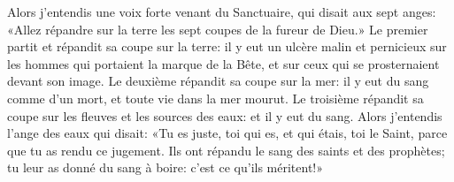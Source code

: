 Alors j’entendis une voix forte venant du Sanctuaire,
	qui disait aux sept anges:
	«Allez répandre sur la terre les sept coupes de la fureur de Dieu.»
Le premier partit et répandit sa coupe sur la terre:
	il y eut un ulcère malin et pernicieux
		sur les hommes qui portaient la marque de la Bête,
	et sur ceux qui se prosternaient devant son image.
Le deuxième répandit sa coupe sur la mer:
	il y eut du sang comme d’un mort, et toute vie dans la mer mourut.
Le troisième répandit sa coupe sur les fleuves et les sources des eaux:
	et il y eut du sang.
Alors j’entendis l’ange des eaux qui disait:
	«Tu es juste, toi qui es, et qui étais, toi le Saint,
	parce que tu as rendu ce jugement.
	Ils ont répandu le sang des saints et des prophètes;
	tu leur as donné du sang à boire:
	c’est ce qu’ils méritent!»
